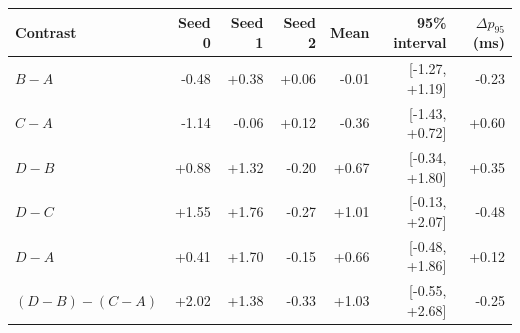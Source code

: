 \begin{tabular}{lrrrrrr}
\hline
Contrast & Seed 0 & Seed 1 & Seed 2 & Mean & 95\% interval & $\Delta p_{95}$ (ms) \\
\hline
$B-A$ & -0.48 & +0.38 & +0.06 & -0.01 & [-1.27, +1.19] & -0.23 \\
$C-A$ & -1.14 & -0.06 & +0.12 & -0.36 & [-1.43, +0.72] & +0.60 \\
$D-B$ & +0.88 & +1.32 & -0.20 & +0.67 & [-0.34, +1.80] & +0.35 \\
$D-C$ & +1.55 & +1.76 & -0.27 & +1.01 & [-0.13, +2.07] & -0.48 \\
$D-A$ & +0.41 & +1.70 & -0.15 & +0.66 & [-0.48, +1.86] & +0.12 \\
$(D-B)-(C-A)$ & +2.02 & +1.38 & -0.33 & +1.03 & [-0.55, +2.68] & -0.25 \\
\hline
\end{tabular}
